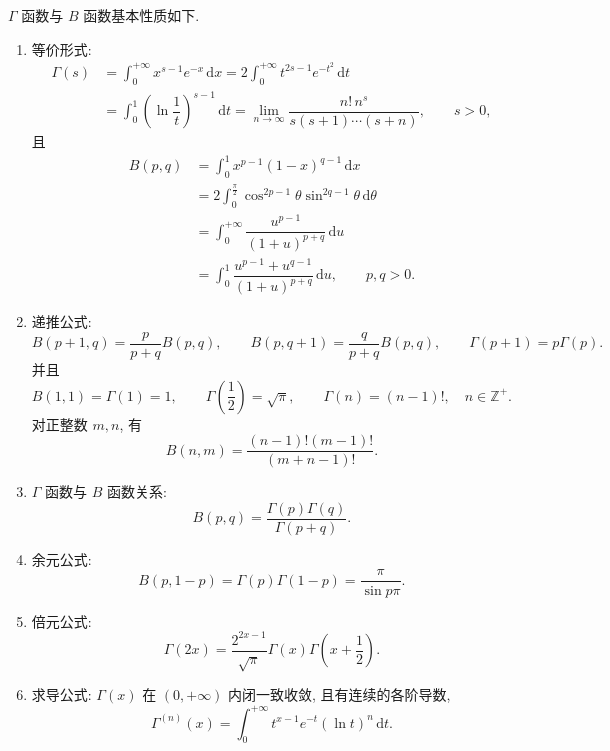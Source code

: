 \documentclass[../数学分析培优讲义.tex]{subfiles}
\begin{document}
\begin{proposition}[\markstar]
$\Gamma$ 函数与 $B$ 函数基本性质如下.

\begin{enumerate}[label=(\arabic*)]
    \item 等价形式:
    \begin{align*}
        \Gamma(s)
        &=\int_0^{+\infty}x^{s-1}e^{-x}\,\mathrm{d}x
        =2\int_0^{+\infty}t^{2s-1}e^{-t^2}\,\mathrm{d}t\\
        &=\int_0^1\left(\ln\dfrac{1}{t}\right)^{s-1}\,\mathrm{d}t
        =\lim\limits_{n\to\infty}\dfrac{n!\,n^s}{s(s+1)\cdots(s+n)},\qquad s>0,
    \end{align*}
    且
    \begin{align*}
        B(p,q)
        &=\int_0^1x^{p-1}(1-x)^{q-1}\,\mathrm{d}x\\
        &=2\int_0^{\frac{\pi}{2}}\cos^{2p-1}\theta\sin^{2q-1}\theta\,\mathrm{d}\theta\\
        &=\int_0^{+\infty}\dfrac{u^{p-1}}{(1+u)^{p+q}}\,\mathrm{d}u\\
        &=\int_0^1\dfrac{u^{p-1}+u^{q-1}}{(1+u)^{p+q}}\,\mathrm{d}u,
        \qquad p,q>0.
    \end{align*}

    \item 递推公式:
    \[
        B(p+1,q)=\dfrac{p}{p+q}B(p,q),\qquad
        B(p,q+1)=\dfrac{q}{p+q}B(p,q),\qquad
        \Gamma(p+1)=p\Gamma(p).
    \]
    并且
    \[
        B(1,1)=\Gamma(1)=1,\qquad
        \Gamma\left(\dfrac{1}{2}\right)=\sqrt{\pi},\qquad
        \Gamma(n)=(n-1)!,\quad n\in\mathbb{Z}^+.
    \]
    对正整数 $m,n$, 有
    \[
        B(n,m)=\dfrac{(n-1)!(m-1)!}{(m+n-1)!}.
    \]

    \item $\Gamma$ 函数与 $B$ 函数关系:
    \[
        B(p,q)=\dfrac{\Gamma(p)\Gamma(q)}{\Gamma(p+q)}.
    \]

    \item 余元公式:
    \[
        B(p,1-p)=\Gamma(p)\Gamma(1-p)=\dfrac{\pi}{\sin p\pi}.
    \]

    \item 倍元公式:
    \[
        \Gamma(2x)=\dfrac{2^{2x-1}}{\sqrt{\pi}}\Gamma(x)\Gamma\left(x+\dfrac{1}{2}\right).
    \]

    \item 求导公式: $\Gamma(x)$ 在 $(0,+\infty)$ 内闭一致收敛, 且有连续的各阶导数,
    \[
        \Gamma^{(n)}(x)=\int_0^{+\infty}t^{x-1}e^{-t}(\ln t)^n\,\mathrm{d}t.
    \]
\end{enumerate}
\end{proposition}
\end{document}

